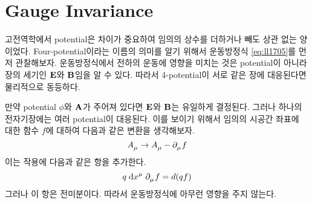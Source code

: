 \section{Gauge Invariance}
\label{sec:05a-04a}

고전역학에서 potential은 차이가 중요하여 임의의 상수를 더하거나 빼도 상관 없는 양이었다. Four-potential이라는 이름의 의미를 알기 위해서 운동방정식 \eqref{eq:ll1705}를 먼저 관찰해보자. 운동방정식에서 전하의 운동에 영향을 미치는 것은 potential이 아니라 장의 세기인 $\vb{E}$와 $\vb{B}$임을 알 수 있다. 따라서 4-potential이 서로 같은 장에 대응된다면 물리적으로 동등하다.

만약 potential $\phi$와 $\vb{A}$가 주어져 있다면 $\vb{E}$와 $\vb{B}$는 유일하게 결정된다. 그러나 하나의 전자기장에는 여러 potential이 대응된다. 이를 보이기 위해서 임의의 시공간 좌표에 대한 함수 $f$에 대하여 다음과 같은 변환을 생각해보자.
\begin{equation}\label{eq:ll1801}
    \tensor{A}{_\mu} \to \tensor{A}{_\mu} - \tensor{\partial}{_\mu} f
\end{equation}
이는 작용에 다음과 같은 항을 추가한다.
\begin{equation}
    q \; \dd \tensor{x}{^\mu} \; \tensor{\partial}{_\mu} f = d ( q f )
\end{equation}
그러나 이 항은 전미분이다. 따라서 운동방정식에 아무런 영향을 주지 않는다.

